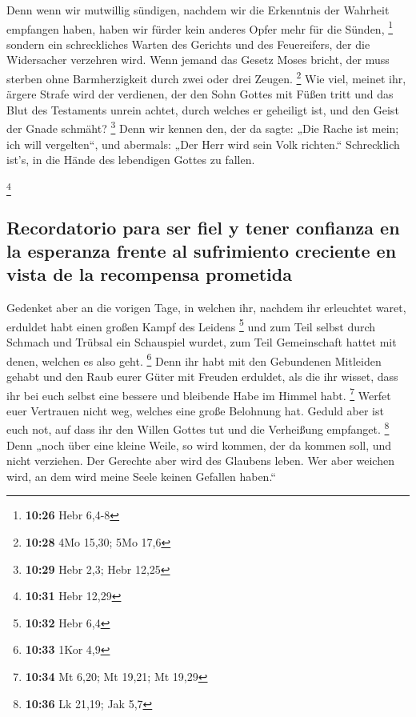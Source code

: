  Denn wenn wir mutwillig sündigen, nachdem wir die
Erkenntnis der Wahrheit empfangen haben, haben wir fürder kein anderes
Opfer mehr für die Sünden, \footnote{\textbf{10:26} Hebr 6,4-8}
 sondern ein schreckliches Warten des Gerichts und des
Feuereifers, der die Widersacher verzehren wird.  Wenn
jemand das Gesetz Moses bricht, der muss sterben ohne Barmherzigkeit
durch zwei oder drei Zeugen. \footnote{\textbf{10:28} 4Mo 15,30; 5Mo
  17,6}  Wie viel, meinet ihr, ärgere Strafe wird der
verdienen, der den Sohn Gottes mit Füßen tritt und das Blut des
Testaments unrein achtet, durch welches er geheiligt ist, und den Geist
der Gnade schmäht? \footnote{\textbf{10:29} Hebr 2,3; Hebr 12,25}
 Denn wir kennen den, der da sagte: „Die Rache ist mein;
ich will vergelten``, und abermals: „Der Herr wird sein Volk richten.``
 Schrecklich ist's, in die Hände des lebendigen Gottes zu
fallen.

\footnote{\textbf{10:31} Hebr 12,29}

\hypertarget{recordatorio-para-ser-fiel-y-tener-confianza-en-la-esperanza-frente-al-sufrimiento-creciente-en-vista-de-la-recompensa-prometida}{%
\subsection{Recordatorio para ser fiel y tener confianza en la esperanza
frente al sufrimiento creciente en vista de la recompensa
prometida}\label{recordatorio-para-ser-fiel-y-tener-confianza-en-la-esperanza-frente-al-sufrimiento-creciente-en-vista-de-la-recompensa-prometida}}

 Gedenket aber an die vorigen Tage, in welchen ihr,
nachdem ihr erleuchtet waret, erduldet habt einen großen Kampf des
Leidens \footnote{\textbf{10:32} Hebr 6,4}  und zum Teil
selbst durch Schmach und Trübsal ein Schauspiel wurdet, zum Teil
Gemeinschaft hattet mit denen, welchen es also geht. \footnote{\textbf{10:33}
  1Kor 4,9}  Denn ihr habt mit den Gebundenen Mitleiden
gehabt und den Raub eurer Güter mit Freuden erduldet, als die ihr
wisset, dass ihr bei euch selbst eine bessere und bleibende Habe im
Himmel habt. \footnote{\textbf{10:34} Mt 6,20; Mt 19,21; Mt 19,29}
 Werfet euer Vertrauen nicht weg, welches eine große
Belohnung hat.  Geduld aber ist euch not, auf dass ihr
den Willen Gottes tut und die Verheißung empfanget. \footnote{\textbf{10:36}
  Lk 21,19; Jak 5,7}  Denn „noch über eine kleine Weile,
so wird kommen, der da kommen soll, und nicht verziehen. 
Der Gerechte aber wird des Glaubens leben. Wer aber weichen wird, an dem
wird meine Seele keinen Gefallen haben.``

